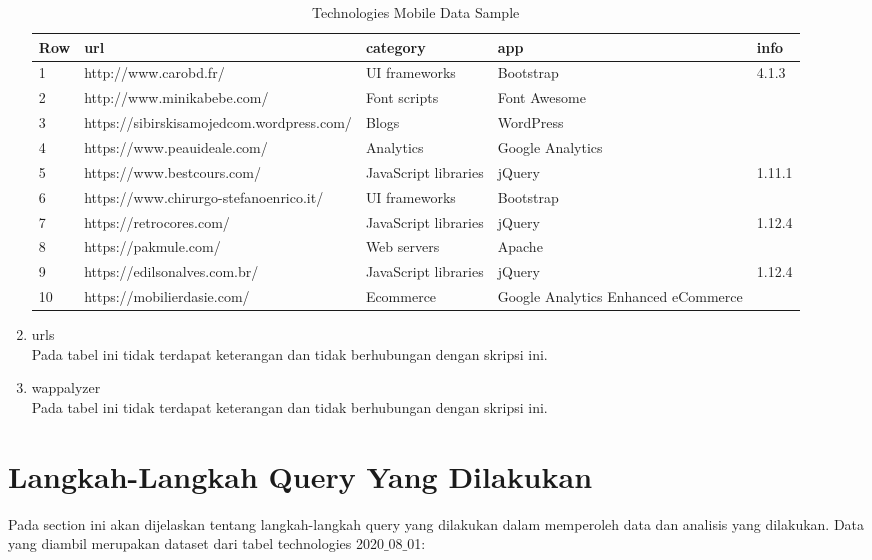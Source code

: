 \begin{enumerate}
	\begin{table}[H]
		\centering
		\begin{tabular}{|l|l|p{3cm}|p{3cm}|l|}
			\hline
			\textbf{Row} & \textbf{url} & \textbf{category} & app & info\\
			\hline
			1 & http://www.carobd.fr/ & UI frameworks & Bootstrap & 4.1.3\\
			\hline
			2 & http://www.minikabebe.com/ & Font scripts & Font Awesome & \\
			\hline
			3 & https://sibirskisamojedcom.wordpress.com/ & Blogs & WordPress & \\
			\hline
			4 & https://www.peauideale.com/ & Analytics & Google Analytics & \\
			\hline
			5 & https://www.bestcours.com/ & JavaScript libraries & jQuery & 1.11.1\\
			\hline
			6 & https://www.chirurgo-stefanoenrico.it/ & UI frameworks & Bootstrap & \\
			\hline
			7 & https://retrocores.com/ & JavaScript libraries & jQuery & 1.12.4\\
			\hline
			8 & https://pakmule.com/ & Web servers & Apache & \\
			\hline
			9 & https://edilsonalves.com.br/ & JavaScript libraries & jQuery & 1.12.4\\
			\hline
			10 & https://mobilierdasie.com/ & Ecommerce & Google Analytics Enhanced eCommerce & \\
			\hline
		\end{tabular}
		\caption{Technologies Mobile Data Sample}
		\label{table:ct_tech_mobile}
	\end{table}
	
	
	\item urls\\
	Pada tabel ini tidak terdapat keterangan dan tidak berhubungan dengan skripsi ini.
	\item wappalyzer\\
	Pada tabel ini tidak terdapat keterangan dan tidak berhubungan dengan skripsi ini.
\end{enumerate}

\section{Langkah-Langkah Query Yang Dilakukan}
Pada section ini akan dijelaskan tentang langkah-langkah query yang dilakukan dalam memperoleh data dan analisis yang dilakukan. Data yang diambil merupakan dataset dari tabel technologies 2020$\_$08$\_$01:


